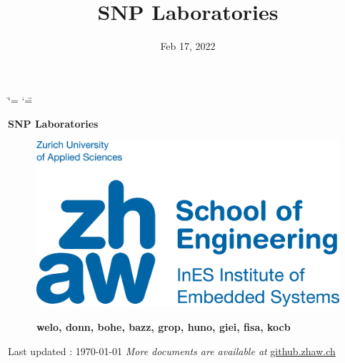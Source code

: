 \documentclass[a4paper,10pt,english]{report}
\title{SNP Laboratories}
\date{Feb 17, 2022}
\author{}
\begin{document}
\ifdefined\shorthandoff
  \ifnum\catcode`\=\string=\active\shorthandoff{=}\fi
  \ifnum\catcode`\"=\active{}\fi
\fi

\pagestyle{empty}

        \begin{titlepage}
        \centering
        \vspace*{40mm} %
        \textbf{\Huge {SNP Laboratories}}
        \vspace{0mm}
        \begin{figure}[!h]
        \centering
        \includegraphics[scale=0.5]{en-zhaw-ines-rgb.png}
        \end{figure}
        \begin{figure}[!h]
        \centering
        \textbf{ welo, donn, bohe, bazz, grop, huno, giei, fisa, kocb }
        \end{figure}
        \vspace*{20mm}
        \vspace{20mm}
        
        \vspace*{0mm}
        \small Last updated : \MonthYearFormat\today
        \vfill
        \small \textit{More documents are available at }{\href{https://github.zhaw.ch/SNP/snp/tree/master/praktika}{github.zhaw.ch}}
        \end{titlepage}
        \clearpage
        \tableofcontents
        \clearpage
        
\pagestyle{plain}
 
\pagestyle{normal}
\label{\detokenize{index::doc}}
\end{document}
